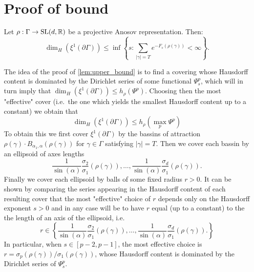 \documentclass{report}
\begin{document}
\section{Proof of bound}
\begin{lemma}\label{lem:upper_bound}
Let $\rho: \Gamma \to \operatorname{{\mathrm{SL}}}(d, \mathbb R)$ be a projective Anosov representation. 
Then:
\[
    \dim_H(\xi^1 (\partial \Gamma) ) \leq
    \inf 
    \left\{ 
        s :  
        \sum_{|\gamma| = T} e^{-F_s(\rho(\gamma))}  < \infty
    \right\}.
\]
\end{lemma}
\begin{remark}
    The idea of the proof of \cref{lem:upper_bound} is to find a covering whose Hausdorff content is dominated by the Dirichlet series of some functional $\Psi_s^p$, which will in turn imply that $\dim_H(\xi^1(\partial \Gamma)) \leq h_\rho(\Psi^p) $.
    Choosing then the most "effective" cover (i.e.\ the one which yields the smallest Hausdorff content up to a constant) we obtain that
    \[
        \dim_H(\xi^1(\partial \Gamma)) \leq h_\rho(\max_p \Psi^p)
    \]
    To obtain this we first cover $\xi^1(\partial \Gamma)$ by the bassins of attraction $\rho(\gamma) \cdot B_{\alpha_1, \alpha} (\rho(\gamma))$ for $\gamma \in \Gamma$ satisfying $|\gamma| = T$.
    Then we cover each bassin by an ellipsoid of axes lengths
    \[
        \frac{1}{\sin(\alpha)} \frac{\sigma_2}{\sigma_1}(\rho(\gamma)), \ldots, 
        \frac{1}{\sin(\alpha)} \frac{\sigma_d}{\sigma_1}(\rho(\gamma)).
    \]
    Finally we cover each ellipsoid by balls of some fixed radius $r>0$.
    It can be shown by comparing the series appearing in the Hausdorff content of each resulting cover that the most "effective" choice of $r$ depends only on the Hausdorff exponent $s > 0$ and in any case will be to have $r$ equal (up to a constant) to the the length of an axis of the ellipsoid, i.e.\
    \[
        r \in \left\{
            \frac{1}{\sin(\alpha)} \frac{\sigma_2}{\sigma_1}(\rho(\gamma)), \ldots, 
            \frac{1}{\sin(\alpha)} \frac{\sigma_d}{\sigma_1}(\rho(\gamma)).    
        \right\}
    \]
    In particular, when $s \in [p-2, p-1]$, the most effective choice is $r = \sigma_p(\rho(\gamma))/\sigma_1(\rho(\gamma))$, whose Hausdorff content is dominated by the Dirichlet series of $\Psi_s^p$.
\end{remark}
\end{document}
